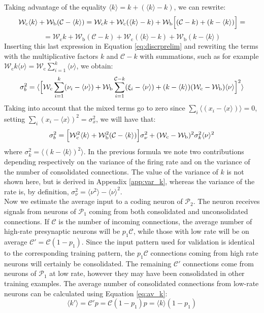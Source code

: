 \documentclass[a4paper, 12pt, twoside, openright]{book}
\newcommand{\popI}{\mathcal{P}_1}
\newcommand{\popII}{\mathcal{P}_2}
\newcommand{\C}{\mathcal{C}}
\newcommand{\Wb}{\mathcal{W}_\text{b}}
\newcommand{\Wc}{\mathcal{W}_\text{c}}
\begin{document}
Taking advantage of the equality $\langle k \rangle=k+(\langle k \rangle-k)$, we can rewrite:
\begin{equation}
   \Wc \langle k \rangle
    + \Wb (\C - \langle k \rangle)
    = \Wc k + \Wc (\langle k \rangle - k) + \Wb \Bigl[(\C-k) + (k-\langle k \rangle ) \Bigr] =
\end{equation}
\begin{equation*}
     =\Wc k + \Wb (\C- k) + \Wc (\langle k \rangle - k)  + \Wb (k - \langle k \rangle)
\end{equation*}
Inserting this last expression in Equation \eqref{eq:discrprelim} and rewriting the terms with the multiplicative factors $k$ and $\C - k$ with summations, such as for example $\Wc k \langle \nu \rangle = \Wc \sum_{i=1}^{k} \langle \nu \rangle$, we obtain:
\begin{equation}
\label{eq:var_sb2}
     \sigma_{b}^2 = \langle \Bigl[ \Wc \sum_{i=1}^k (\nu_i - \langle \nu \rangle) +\Wb \sum_{i=1}^ {\C-k} (\xi_i - \langle \nu \rangle) + (k-\langle k \rangle)(\Wc-\Wb)\langle \nu \rangle \Bigr]^2 \rangle
\end{equation}
Taking into account that the mixed terms go to zero since $\sum_{i} \langle(x_i - \langle x \rangle) \rangle=0$, setting $\sum_{i} (x_i - \langle x \rangle)^ 2=\sigma^{2}_{x}$, we will have that:
\begin{equation}
\label{variance_sigmab}
     \sigma_{b}^2= \Bigl[\Wc^2 \langle k \rangle + \Wb^2 (\C - \langle k \rangle)\Bigr] \sigma_{\nu}^2 + (\Wc - \Wb)^2 \sigma_{k}^2 \langle \nu \rangle ^2
\end{equation}
where $\sigma_{k}^2 = \langle (k- \langle k\rangle )^2 \rangle$.
In the previous formula we note two contributions depending respectively on the variance of the firing rate and on the variance of the number of consolidated connections.
The value of the variance of $k$ is not shown here, but is derived in Appendix \ref{app:var_k}, whereas the variance of the rate is, by definition, $\sigma^2_{\nu}=\langle\nu^2\rangle - \langle\nu\rangle^2$. \\
Now we estimate the average input to a coding neuron of $\popII$. The neuron receives signals from neurons of $\popI$ coming from both consolidated and unconsolidated connections.
If $\C$ is the number of incoming connections, the average number of high-rate presynaptic neurons will be $p_1 \C$, while those with low rate will be on average $\C' = \C (1 - p_1)$.
Since the input pattern used for validation is identical to the corresponding training pattern, the $p_1 \C$ connections coming from high rate neurons will certainly be consolidated.
The remaining $\C'$ connections come from neurons of $\popI$ at low rate, however they may have been consolidated in other training examples.
The average number of consolidated connections
from low-rate neurons can be calculated using Equation \eqref{eq:av_k}:
\begin{equation}
\label{eq:av_k1}
    \langle k' \rangle = \C' p = \C(1-p_1) p = \langle k \rangle (1 - p_1)
\end{equation}
\end{document}
